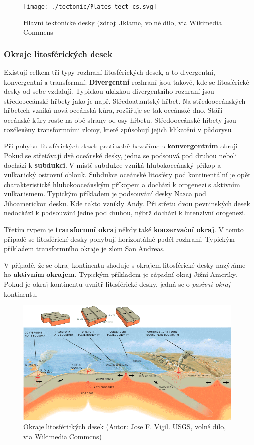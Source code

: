 \begin{figure}[h]
	\texttt{[image: ./tectonic/Plates\_tect\_cs.svg]}
	\caption{Hlavní tektonické desky (zdroj: Jklamo, volné dílo, via Wikimedia Commons}
\end{figure}

\subsubsection{Okraje litosférických desek}
Existují celkem tři typy rozhraní litosférických desek, a to divergentní, konvergentní a transformní. \textbf{Divergentní} rozhraní jsou takové, kde se litosférické desky od sebe vzdalují. Typickou ukázkou divergentního rozhraní jsou středooceánské hřbety jako je např. Středoatlantský hřbet. Na středooceánských hřbetech vzniká nová oceánská kůra, rozšiřuje se tak oceánské dno. Stáří oceánské kůry roste na obě strany od osy hřbetu. Středooceánské hřbety jsou rozčleněny transformními zlomy, které způsobují jejich klikatění v půdorysu. 

Při pohybu litosférických desek proti sobě hovoříme o \textbf{konvergentním} okraji. Pokud se střetávají dvě oceánské desky, jedna se podsouvá pod druhou neboli dochází k \textbf{subdukci}. V místě subdukce vzniká hlubokoceánský příkop a vulkanický ostrovní oblouk.  Subdukce oceánské litosféry pod kontinentální je opět charakteristické hlubokooceánským příkopem a dochází k orogenezi s aktivním vulkanismem. Typickým příkladem je podsouvání desky Nazca pod Jihoamerickou desku. Kde takto vznikly Andy. Při střetu dvou pevninských desek nedochází k podsouvání jedné pod druhou, nýbrž dochází k intenzivní orogenezi. 

Třetím typem je \textbf{transformní okraj} někdy také \textbf{konzervační okraj}. V tomto případě se litosférické desky pohybují horizontálně podél rozhraní. Typickým příkladem transformního okraje je zlom San Andreas.

V případě, že se okraj kontinentu shoduje s okrajem litosférické desky nazýváme ho \textbf{aktivním okrajem}. Typickým příkladem je západní okraj Jižní Ameriky. Pokud je okraj kontinentu uvnitř litosférické desky, jedná se o \emph{pasivní okraj} kontinentu. 

\begin{figure}[h]
	\centering
	\includegraphics[width=1\linewidth]{obrazky/tectonic/Tectonic_plate_boundaries}
	\caption{Okraje litosférických desek (Autor: Jose F. Vigil. USGS, volné dílo, via Wikimedia Commons)}
	\label{fig:tectonicplateboundaries}
\end{figure}


